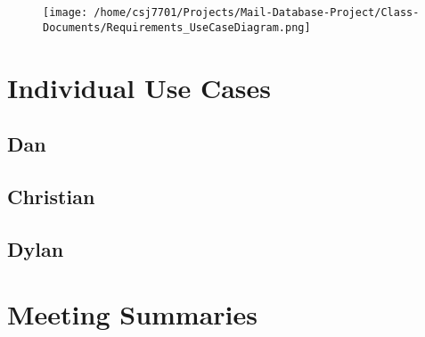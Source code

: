 \documentclass[11pt]{article}
\begin{document}
\begin{figure}[htbp]
\centering
\texttt{[image: /home/csj7701/Projects/Mail-Database-Project/Class-Documents/Requirements\_UseCaseDiagram.png]}
\bicaption{---}
\end{figure}
\section{Individual Use Cases}
\label{sec:org864acaf}

\subsection{Dan}
\label{sec:org469b0a4}

\subsection{Christian}
\label{sec:orga806134}

\subsection{Dylan}
\label{sec:org513a4c7}
\section{Meeting Summaries}
\label{sec:orgbf1c6ee}
\end{document}
